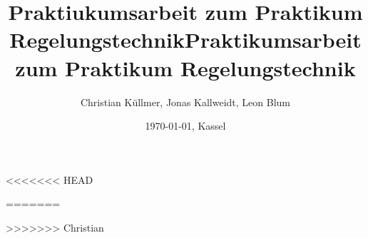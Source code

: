 \documentclass[10pt]{scrartcl}
\begin{document}
<<<<<<< HEAD
\title{Praktiukumsarbeit zum Praktikum Regelungstechnik}
=======










\title{Praktikumsarbeit zum Praktikum Regelungstechnik}
>>>>>>> Christian
\author{Christian Küllmer, Jonas Kallweidt, Leon Blum}
\date{\today{}, Kassel}
\maketitle
\newpage
\renewcommand{\contentsname}{Inhaltsverzeichnis}
\tableofcontents
\newpage
\listoffigures
\newpage






\end{document}
